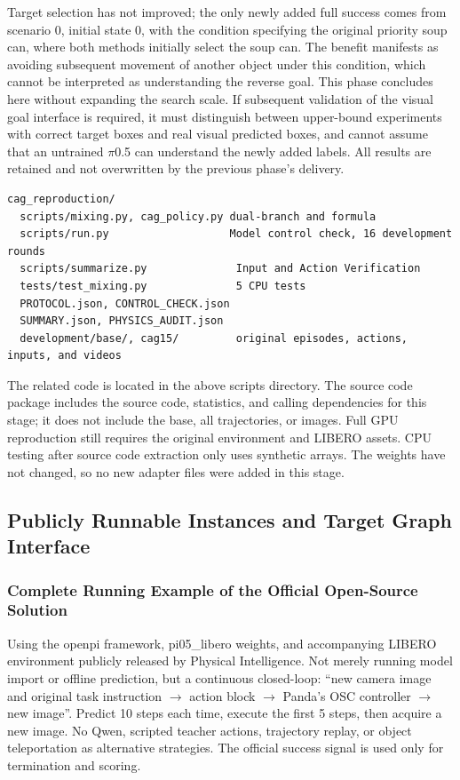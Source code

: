 Target selection has not improved; the only newly added full success comes from scenario 0, initial state 0, with the condition specifying the original priority soup can, where both methods initially select the soup can. The benefit manifests as avoiding subsequent movement of another object under this condition, which cannot be interpreted as understanding the reverse goal. This phase concludes here without expanding the search scale. If subsequent validation of the visual goal interface is required, it must distinguish between upper-bound experiments with correct target boxes and real visual predicted boxes, and cannot assume that an untrained \(\pi\)0.5 can understand the newly added labels. All results are retained and not overwritten by the previous phase's delivery.

\begin{Verbatim}[breaklines=true,breakanywhere=true,fontsize=\footnotesize]
cag_reproduction/
  scripts/mixing.py, cag_policy.py dual-branch and formula
  scripts/run.py                   Model control check, 16 development rounds
  scripts/summarize.py              Input and Action Verification
  tests/test_mixing.py              5 CPU tests
  PROTOCOL.json, CONTROL_CHECK.json
  SUMMARY.json, PHYSICS_AUDIT.json
  development/base/, cag15/         original episodes, actions, inputs, and videos
\end{Verbatim}

The related code is located in the above scripts directory. The source code package includes the source code, statistics, and calling dependencies for this stage; it does not include the base, all trajectories, or images. Full GPU reproduction still requires the original environment and LIBERO assets. CPU testing after source code extraction only uses synthetic arrays. The weights have not changed, so no new adapter files were added in this stage.


\subsection{Publicly Runnable Instances and Target Graph Interface}\label{s14-detail-12}

\subsubsection{Complete Running Example of the Official Open-Source Solution}\label{s14-detail-13}

Using the openpi framework, pi05\_libero weights, and accompanying LIBERO environment publicly released by Physical Intelligence. Not merely running model import or offline prediction, but a continuous closed-loop: ``new camera image and original task instruction \(\rightarrow\) action block \(\rightarrow\) Panda's OSC controller \(\rightarrow\) new image''. Predict 10 steps each time, execute the first 5 steps, then acquire a new image. No Qwen, scripted teacher actions, trajectory replay, or object teleportation as alternative strategies. The official success signal is used only for termination and scoring.

